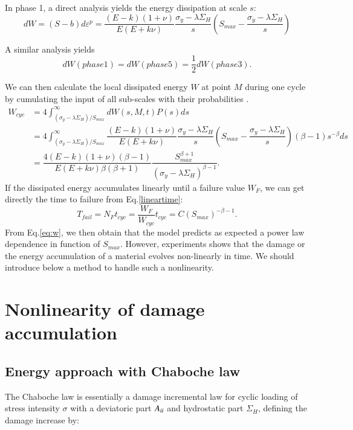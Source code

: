\documentclass[3p,times,number,review]{elsarticle}
\begin{document}
In phase 1, a direct analysis yields the energy dissipation at scale $s$:
\begin{equation}dW=(S-b)d\varepsilon^p=\dfrac{(E-k)(1+\nu) }{E(E+k\nu)}\dfrac{\sigma_y-\lambda \Sigma_H}{s}\left(S_{max}-\dfrac{\sigma_y-\lambda \Sigma_H}{s}\right)
\label{dw}
\end{equation}

A similar analysis yields $$dW(phase 1)=dW(phase 5)=\dfrac{1}{2}dW(phase 3).$$

We can then calculate  the local dissipated energy $W$  at point $M$ during one cycle by cumulating the input of all sub-scales with their probabilities \cite{zepeng}.
\begin{equation}
\begin{split}
W_{cyc}&=4\int_{\left( \sigma_y-\lambda \Sigma_H\right) /S_{max}}^{\infty}dW(s,M,t)P(s)ds
\\&=4\int_{\left( \sigma_y-\lambda \Sigma_H\right) /S_{max}}^{\infty}\dfrac{(E-k)(1+\nu) }{E(E+k\nu)}\dfrac{\sigma_y-\lambda \Sigma_H}{s}\left(S_{max}-\dfrac{\sigma_y-\lambda \Sigma_H}{s}\right)\left( \beta-1\right) s^{-\beta}ds
\\&=\dfrac{4(E-k)(1+\nu)\left( \beta-1\right) }{ E(E+k\nu)\beta\left( \beta+1\right) }\dfrac{S_{max}^{\beta+1}}{\left( \sigma_y-\lambda \Sigma_H\right) ^{\beta-1}}.
\end{split}
\label{eq:w}
\end{equation}
 If the dissipated energy accumulates linearly until a failure value $W_F$, we can get directly the time to failure from Eq.\eqref{lineartime}:
\begin{equation}
T_{fail}=N_{F}t_{cyc}=\dfrac{W_F}{W_{cyc}}t_{cyc}=C(S_{max})^{-\beta-1}.
\label{lineartime}
\end{equation}
From Eq.\eqref{eq:w}, we then obtain that the model predicts as expected a power law dependence in function of $S_{max}$.
However, experiments shows that the damage or the energy accumulation of a material evolves non-linearly in time. We should introduce below a method to handle such a nonlinearity.

\section{Nonlinearity of damage accumulation}
\subsection{Energy approach with Chaboche law}
The Chaboche law\cite{lemaitre1990mechanics} is essentially a damage incremental law for cyclic loading of stress intensity $\sigma$ with a deviatoric part ${A}_{\uppercase\expandafter{\romannumeral2}}$ and hydrostatic part $\Sigma_H$, defining the damage increase by:
\end{document}
